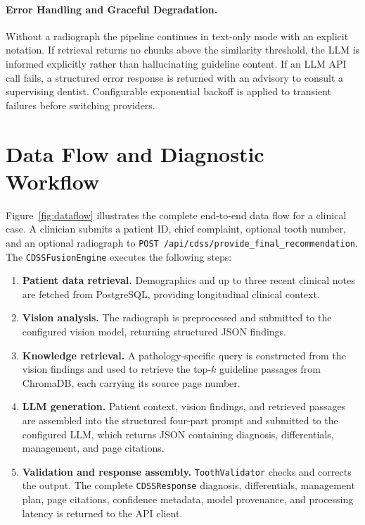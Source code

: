 \documentclass[12pt,a4paper]{report}
\begin{document}
	
	\paragraph{Error Handling and Graceful Degradation.}
	Without a radiograph the pipeline continues in text-only mode with an explicit notation.
	If retrieval returns no chunks above the similarity threshold, the LLM is informed
	explicitly rather than hallucinating guideline content. If an LLM API call fails, a
	structured error response is returned with an advisory to consult a supervising dentist.
	Configurable exponential backoff is applied to transient failures before switching
	providers.
	
	\section{Data Flow and Diagnostic Workflow}
	\label{sec:workflow}
	
	Figure~\ref{fig:dataflow} illustrates the complete end-to-end data flow for a clinical
	case. A clinician submits a patient ID, chief complaint, optional tooth number, and an
	optional radiograph to \texttt{POST /api/cdss/provide\_final\_recommendation}.
	The \texttt{CDSSFusionEngine} executes the following steps:
	
	\begin{enumerate}
		\item \textbf{Patient data retrieval.} Demographics and up to three recent clinical notes
		are fetched from PostgreSQL, providing longitudinal clinical context.
		\item \textbf{Vision analysis.} The radiograph is preprocessed and submitted to the
		configured vision model, returning structured JSON findings.
		\item \textbf{Knowledge retrieval.} A pathology-specific query is constructed from the
		vision findings and used to retrieve the top-$k$ guideline passages from ChromaDB,
		each carrying its source page number.
		\item \textbf{LLM generation.} Patient context, vision findings, and retrieved passages
		are assembled into the structured four-part prompt and submitted to the configured LLM,
		which returns JSON containing diagnosis, differentials, management, and page citations.
		\item \textbf{Validation and response assembly.} \texttt{ToothValidator} checks and
		corrects the output. The complete \texttt{CDSSResponse} diagnosis, differentials,
		management plan, page citations, confidence metadata, model provenance, and processing
		latency is returned to the API client.
	\end{enumerate}
	
\end{document}
